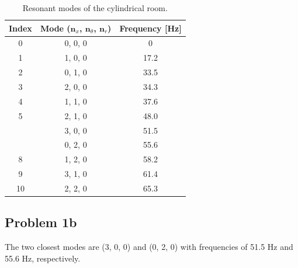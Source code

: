 \setlength{\abovecaptionskip}{0pt}
\vspace{0.1cm}
{\renewcommand{\arraystretch}{1.5}
\begin{table}[h!]
    \begin{center}
        \small
        \begin{tabular}{ | c | c | c | }
            \hline
            \textbf{Index}  &  \textbf{Mode ($\mathbf n_x$, $\mathbf n_\theta$, $\mathbf n_r$)}  &  \textbf{Frequency [Hz]}  \\
            \hline
                0  &  0, 0, 0  &  0  \\
                \rowcolor{Gray}
                1  &  1, 0, 0  &  17.2  \\
                2  &  0, 1, 0  &  33.5  \\
                \rowcolor{Gray}
                3  &  2, 0, 0  &  34.3  \\
                4  &  1, 1, 0  &  37.6  \\
                \rowcolor{Gray}
                5  &  2, 1, 0  &  48.0  \\
                \rowcolor{pink}
                \hline
                6  &  3, 0, 0  &  51.5  \\
                \rowcolor{pink}
                \hline
                7  &  0, 2, 0  &  55.6  \\
                \hline
                8  &  1, 2, 0  &  58.2  \\
                \rowcolor{Gray}
                9  &  3, 1, 0  &  61.4  \\
                10  &  2, 2, 0  &  65.3  \\
            \hline
        \end{tabular}
    \end{center}
    \caption{Resonant modes of the cylindrical room.}
    \label{table:resonanceFrequencies}
\end{table}




\vspace{0.25cm}
\subsection*{Problem 1b}

The two closest modes are (3, 0, 0) and (0, 2, 0) with frequencies of 51.5 Hz and 55.6 Hz, respectively.




\vspace{0.25cm}
}

